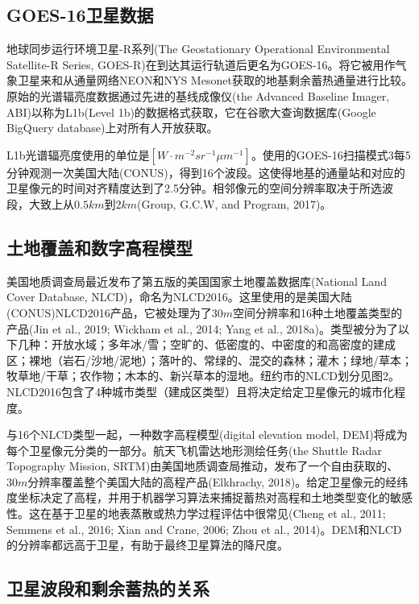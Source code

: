 \documentclass[3p,times]{elsarticle}
\begin{document}
\subsection{GOES-16卫星数据}

地球同步运行环境卫星-R系列(The Geostationary Operational Environmental Satellite-R Series, GOES-R)在到达其运行轨道后更名为GOES-16。将它被用作气象卫星来和从通量网络NEON和NYS Mesonet获取的地基剩余蓄热通量进行比较。原始的光谱辐亮度数据通过先进的基线成像仪(the Advanced Baseline Imager, ABI)以称为L1b(Level 1b)的数据格式获取，它在谷歌大查询数据库(Google BigQuery database)上对所有人开放获取。

L1b光谱辐亮度使用的单位是$[W\cdot m^{-2}{sr}^{-1}{\mu m}^{-1}]$。使用的GOES-16扫描模式3每5分钟观测一次美国大陆(CONUS)，得到16个波段。这使得地基的通量站和对应的卫星像元的时间对齐精度达到了2.5分钟。相邻像元的空间分辨率取决于所选波段，大致上从$0.5km$到$2km$(Group, G.C.W, and Program, 2017)。

\subsection{土地覆盖和数字高程模型}

美国地质调查局最近发布了第五版的美国国家土地覆盖数据库(National Land Cover Database, NLCD)，命名为NLCD2016。这里使用的是美国大陆(CONUS)NLCD2016产品，它被处理为了$30m$空间分辨率和16种土地覆盖类型的产品(Jin et al., 2019; Wickham et al., 2014; Yang et al., 2018a)。类型被分为了以下几种：开放水域；多年冰/雪；空旷的、低密度的、中密度的和高密度的建成区；裸地（岩石/沙地/泥地）；落叶的、常绿的、混交的森林；灌木；绿地/草本；牧草地/干草；农作物；木本的、新兴草本的湿地。纽约市的NLCD划分见图2。NLCD2016包含了4种城市类型（建成区类型）且将决定给定卫星像元的城市化程度。

与16个NLCD类型一起，一种数字高程模型(digital elevation model, DEM)将成为每个卫星像元分类的一部分。航天飞机雷达地形测绘任务(the Shuttle Radar Topography Mission, SRTM)由美国地质调查局推动，发布了一个自由获取的、$30m$分辨率覆盖整个美国大陆的高程产品(Elkhrachy, 2018)。给定卫星像元的经纬度坐标决定了高程，并用于机器学习算法来捕捉蓄热对高程和土地类型变化的敏感性。这在基于卫星的地表蒸散或热力学过程评估中很常见(Cheng et al., 2011; Semmens et al., 2016; Xian and Crane, 2006; Zhou et al., 2014)。DEM和NLCD的分辨率都远高于卫星，有助于最终卫星算法的降尺度。

\subsection{卫星波段和剩余蓄热的关系}
\end{document}
